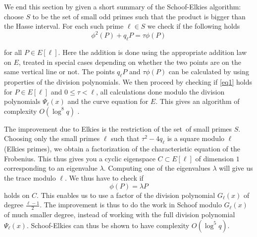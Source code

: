We end this section by given a short summary of the Schoof-Elkies algorithm:
choose $S$ to be the set of small odd primes such that the product is bigger than the Hasse
interval. For each such prime $\ell \in S$ we check if the following holds
\begin{equation} \label{eq1}
 \phi^2(P) + q_\ell P = \tau \phi(P)
\end{equation}

for all $P\in E[\ell]$. Here the addition is done using the appropriate addition law on $E$,
treated in special cases depending on whether the two points are on the same vertical line
or not. The points $q_\ell P$ and $\tau \phi(P)$ can be calculated by using properties of
the division polynomials. We then proceed by checking if \eqref{eq1} holds for $P\in E[\ell]$ and
$ 0 \leq \tau < \ell$, all calculations done modulo the division polynomials $\Psi_\ell(x)$
and the curve equation for $E$. This gives an algorithm of complexity $O(\log^8 q)$ \cite{Schoof}.

The improvement due to Elkies is the restriction of the set of small primes $S$. Choosing
only the small primes $\ell$ such that $\tau^2 - 4q_\ell$ is a square modulo $\ell$ (Elkies primes),
we obtain a factorization of the characteristic equation of the Frobenius. This thus
gives you a cyclic eigenspace $C\subset E[\ell]$ of dimension $1$ corresponding to an eigenvalue
$\lambda$. Computing one of the eigenvalues $\lambda$ will give us the trace modulo $\ell$.
We thus have to check if
$$ \phi(P) = \lambda P$$
holds on $C$. This enables us to use a factor of the division polynomial $G_\ell(x)$ of degree
$\frac{\ell-1}{2}$. The improvement is thus to do the work in Schoof
modulo $G_\ell(x)$ of much smaller degree, instead of working with the full division polynomial $\Psi_\ell(x)$.
Schoof-Elkies can thus be shown \cite{Schoof} to have complexity $O(\log^5 q)$.